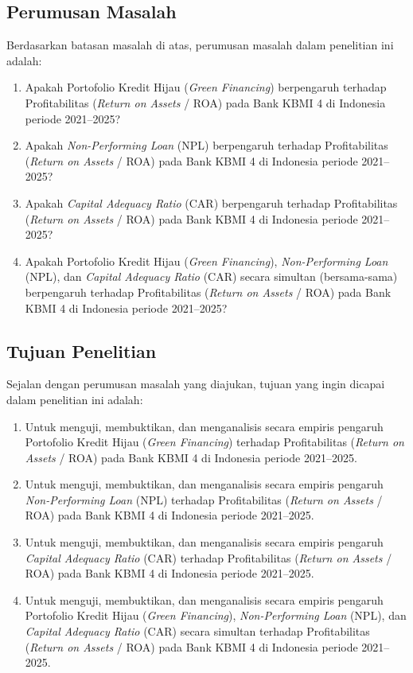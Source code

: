 \documentclass[12pt,a4paper]{article}
\numberwithin{equation}{section}
\begin{document}
\subsection{Perumusan Masalah}

\noindent
Berdasarkan batasan masalah di atas, perumusan masalah dalam penelitian ini adalah:
\begin{enumerate}
  \item Apakah Portofolio Kredit Hijau (\emph{Green Financing}) berpengaruh terhadap Profitabilitas (\emph{Return on Assets} / ROA) pada Bank KBMI 4 di Indonesia periode 2021--2025?
  \item Apakah \emph{Non-Performing Loan} (NPL) berpengaruh terhadap Profitabilitas (\emph{Return on Assets} / ROA) pada Bank KBMI 4 di Indonesia periode 2021--2025?
  \item Apakah \emph{Capital Adequacy Ratio} (CAR) berpengaruh terhadap Profitabilitas (\emph{Return on Assets} / ROA) pada Bank KBMI 4 di Indonesia periode 2021--2025?
  \item Apakah Portofolio Kredit Hijau (\emph{Green Financing}), \emph{Non-Performing Loan} (NPL), dan \emph{Capital Adequacy Ratio} (CAR) secara simultan (bersama-sama) berpengaruh terhadap Profitabilitas (\emph{Return on Assets} / ROA) pada Bank KBMI 4 di Indonesia periode 2021--2025?
\end{enumerate}

\subsection{Tujuan Penelitian}

\noindent
Sejalan dengan perumusan masalah yang diajukan, tujuan yang ingin dicapai dalam penelitian ini adalah:
\begin{enumerate}
  \item Untuk menguji, membuktikan, dan menganalisis secara empiris pengaruh Portofolio Kredit Hijau (\emph{Green Financing}) terhadap Profitabilitas (\emph{Return on Assets} / ROA) pada Bank KBMI 4 di Indonesia periode 2021--2025.
  \item Untuk menguji, membuktikan, dan menganalisis secara empiris pengaruh \emph{Non-Performing Loan} (NPL) terhadap Profitabilitas (\emph{Return on Assets} / ROA) pada Bank KBMI 4 di Indonesia periode 2021--2025.
  \item Untuk menguji, membuktikan, dan menganalisis secara empiris pengaruh \emph{Capital Adequacy Ratio} (CAR) terhadap Profitabilitas (\emph{Return on Assets} / ROA) pada Bank KBMI 4 di Indonesia periode 2021--2025.
  \item Untuk menguji, membuktikan, dan menganalisis secara empiris pengaruh Portofolio Kredit Hijau (\emph{Green Financing}), \emph{Non-Performing Loan} (NPL), dan \emph{Capital Adequacy Ratio} (CAR) secara simultan terhadap Profitabilitas (\emph{Return on Assets} / ROA) pada Bank KBMI 4 di Indonesia periode 2021--2025.
\end{enumerate}
\end{document}
